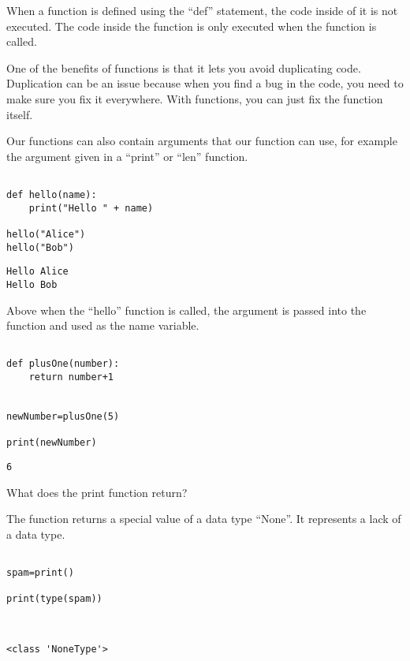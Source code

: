 \documentclass[11pt]{article}
\begin{document}
When a function is defined using the ``def'' statement, the code inside of it is not executed. The code inside the function is only executed when the function is called.

One of the benefits of functions is that it lets you avoid duplicating code. Duplication can be an issue because when you find a bug in the code, you need to make sure you fix it everywhere. With functions, you can just fix the function itself.

Our functions can also contain arguments that our function can use, for example the argument given in a ``print'' or ``len'' function.




\begin{verbatim}

def hello(name):
    print("Hello " + name)

hello("Alice")
hello("Bob")

\end{verbatim}

\begin{verbatim}
Hello Alice
Hello Bob
\end{verbatim}


Above when the ``hello'' function is called, the argument is passed into the function and used as the name variable.


\begin{verbatim}

def plusOne(number):
    return number+1


newNumber=plusOne(5)

print(newNumber)

\end{verbatim}

\begin{verbatim}
6
\end{verbatim}



What does the print function return?

The function returns a special value of a data type ``None''. It represents a lack of a data type.


\begin{verbatim}

spam=print()

print(type(spam))


\end{verbatim}

\begin{verbatim}

<class 'NoneType'>
\end{verbatim}
\end{document}
